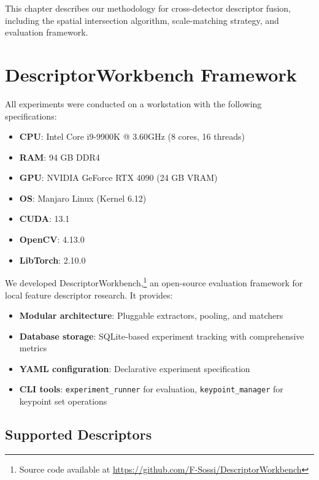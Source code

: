 
This chapter describes our methodology for cross-detector descriptor fusion, including the spatial intersection algorithm, scale-matching strategy, and evaluation framework.

\section{DescriptorWorkbench Framework}

All experiments were conducted on a workstation with the following specifications:

\begin{itemize}
    \item \textbf{CPU}: Intel Core i9-9900K @ 3.60GHz (8 cores, 16 threads)
    \item \textbf{RAM}: 94 GB DDR4
    \item \textbf{GPU}: NVIDIA GeForce RTX 4090 (24 GB VRAM)
    \item \textbf{OS}: Manjaro Linux (Kernel 6.12)
    \item \textbf{CUDA}: 13.1
    \item \textbf{OpenCV}: 4.13.0
    \item \textbf{LibTorch}: 2.10.0
\end{itemize}

We developed DescriptorWorkbench,\footnote{Source code available at \url{https://github.com/F-Sossi/DescriptorWorkbench}} an open-source evaluation framework for local feature descriptor research. It provides:

\begin{itemize}
    \item \textbf{Modular architecture}: Pluggable extractors, pooling, and matchers
    \item \textbf{Database storage}: SQLite-based experiment tracking with comprehensive metrics
    \item \textbf{YAML configuration}: Declarative experiment specification
    \item \textbf{CLI tools}: \texttt{experiment\_runner} for evaluation, \texttt{keypoint\_manager} for keypoint set operations
\end{itemize}

\subsection{Supported Descriptors}

